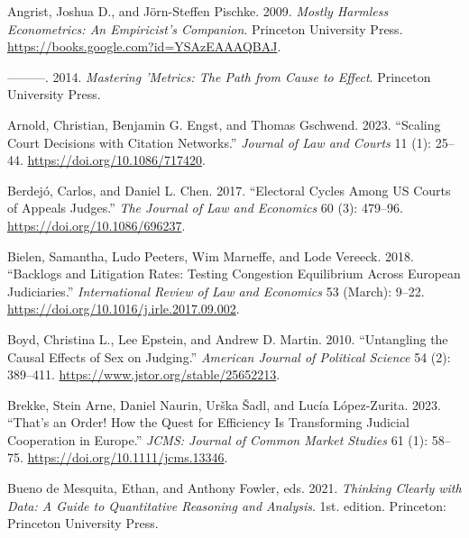 \documentclass[
  11pt,
]{article}
\newlength{\cslhangindent}
\newenvironment{CSLReferences}[2] %
 {%
  \setlength{\parindent}{0pt}
  \ifodd #1 \everypar{\setlength{\hangindent}{\cslhangindent}}\ignorespaces\fi
  \ifnum #2 > 0
  \setlength{\parskip}{#2\baselineskip}
  \fi
 }%
 {}
\begin{document}
\hypertarget{refs}{}
\begin{CSLReferences}{1}{0}
\leavevmode{}%
Angrist, Joshua D., and Jörn-Steffen Pischke. 2009. \emph{Mostly
{Harmless Econometrics}: {An Empiricist}'s {Companion}}. {Princeton
University Press}. \url{https://books.google.com?id=YSAzEAAAQBAJ}.

\leavevmode{}%
---------. 2014. \emph{Mastering '{Metrics}: {The Path} from {Cause} to
{Effect}}. {Princeton University Press}.

\leavevmode{}%
Arnold, Christian, Benjamin G. Engst, and Thomas Gschwend. 2023.
{``Scaling {Court Decisions} with {Citation Networks}.''} \emph{Journal
of Law and Courts} 11 (1): 25--44. \url{https://doi.org/10.1086/717420}.

\leavevmode{}%
Berdejó, Carlos, and Daniel L. Chen. 2017. {``Electoral {Cycles} Among
{US Courts} of {Appeals Judges}.''} \emph{The Journal of Law and
Economics} 60 (3): 479--96. \url{https://doi.org/10.1086/696237}.

\leavevmode{}%
Bielen, Samantha, Ludo Peeters, Wim Marneffe, and Lode Vereeck. 2018.
{``Backlogs and Litigation Rates: {Testing} Congestion Equilibrium
Across {European} Judiciaries.''} \emph{International Review of Law and
Economics} 53 (March): 9--22.
\url{https://doi.org/10.1016/j.irle.2017.09.002}.

\leavevmode{}%
Boyd, Christina L., Lee Epstein, and Andrew D. Martin. 2010.
{``Untangling the {Causal Effects} of {Sex} on {Judging}.''}
\emph{American Journal of Political Science} 54 (2): 389--411.
\url{https://www.jstor.org/stable/25652213}.

\leavevmode{}%
Brekke, Stein Arne, Daniel Naurin, Urška Šadl, and Lucía López-Zurita.
2023. {``That's an {Order}! {How} the {Quest} for {Efficiency Is
Transforming Judicial Cooperation} in {Europe}.''} \emph{JCMS: Journal
of Common Market Studies} 61 (1): 58--75.
\url{https://doi.org/10.1111/jcms.13346}.

\leavevmode{}%
Bueno de Mesquita, Ethan, and Anthony Fowler, eds. 2021. \emph{Thinking
Clearly with Data: A Guide to Quantitative Reasoning and Analysis}. 1st.
edition. {Princeton}: {Princeton University Press}.


\end{CSLReferences}
\end{document}
